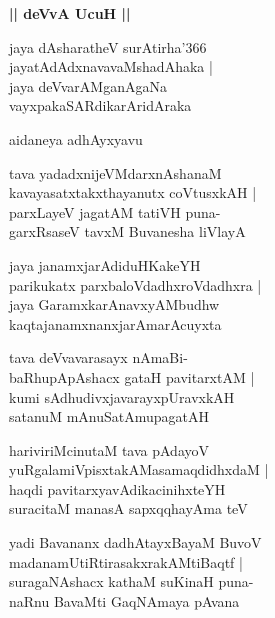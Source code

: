 \documentclass[twoside,12pt,openright]{book}
\newcounter{shloka}[chapter]
\def\uvaca#1{\centerline{{\large\textbf{#1}}}}
\begin{document}
\uvaca{|| deVvA UcuH ||}

\begin{shloka}%
jaya dAsharatheV surAtirha\char'366 \\
jayatAdAdxnavavaMshadAhaka |\\
jaya deVvarAMganAgaNa \\
vayxpakaSARdikarAridAraka
\end{shloka}

\begin{center}
aidaneya adhAyxyavu
\end{center}

\begin{shloka}%
tava yadadxnijeVMdarxnAshanaM \\
kavayasatxtakxthayanutx coVtusxkAH |\\
parxLayeV jagatAM tatiVH puna-\\
garxRsaseV tavxM Buvanesha liVlayA 
\end{shloka}

\begin{shloka}%
jaya janamxjarAdiduHKakeYH \\
parikukatx parxbaloVdadhxroVdadhxra |\\
jaya GaramxkarAnavxyAMbudhw\\
kaqtajanamxnanxjarAmarAcuyxta
\end{shloka}

\begin{shloka}%
tava deVvavarasayx nAmaBi-\\
baRhupApAshacx gataH pavitarxtAM |\\
kumi sAdhudivxjavarayxpUravxkAH\\
satanuM mAnuSatAmupagatAH
\end{shloka}

\begin{shloka}%
hariviriMcinutaM tava pAdayoV \\
yuRgalamiVpisxtakAMasamaqdidhxdaM |\\
haqdi pavitarxyavAdikacinihxteYH \\
suracitaM manasA sapxqqhayAma teV
\end{shloka}

\begin{shloka}%
yadi Bavananx dadhAtayxBayaM BuvoV \\
madanamUtiRtirasakxrakAMtiBaqtf |\\
suragaNAshacx kathaM suKinaH puna-\\
naRnu BavaMti GaqNAmaya pAvana
\end{shloka}
\end{document}

